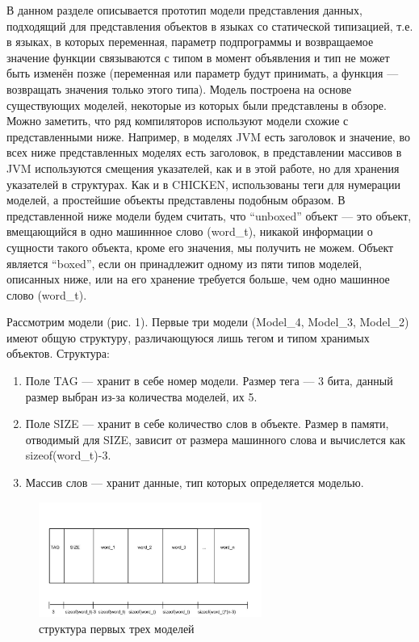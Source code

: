 В данном разделе описывается прототип модели представления данных,
подходящий для представления объектов в языках со статической типизацией, 
т.е. в языках, в которых переменная, параметр подпрограммы и
возвращаемое значение функции связываются с типом 
в момент объявления и тип не может быть изменён позже
(переменная или параметр будут принимать, а функция 
— возвращать значения только этого типа).
Модель построена на основе существующих моделей,
некоторые из которых были представлены в обзоре.
Можно заметить, что ряд компиляторов используют модели схожие с 
представленными ниже. 
Например, в моделях JVM
есть заголовок и значение, во всех ниже представленных моделях есть заголовок,
в представлении массивов в JVM используются смещения указателей,
как и в этой работе,
но для хранения указателей в структурах. 
Как и в CHIСKEN, использованы теги для нумерации моделей,
а простейшие объекты представлены подобным образом.
В представленной ниже модели будем считать, что ``unboxed''  объект — это объект,
вмещающийся в одно машиннное слово (word\_t), 
никакой информации о сущности такого объекта, кроме его значения, мы получить не можем.
Объект является ``boxed'', если он принадлежит одному из пяти
типов моделей, описанных ниже, или на его хранение требуется больше,
чем одно машинное слово (word\_t).

Рассмотрим модели (рис. 1). Первые три модели (Model\_4, Model\_3, Model\_2) имеют общую структуру, различающуюся лишь тегом и типом хранимых объектов.
Структура:
\begin{enumerate}
\item Поле TAG — хранит в себе номер модели. Размер тега — 3 бита, данный размер выбран из-за количества моделей, их 5.
\item Поле SIZE — хранит в себе количество слов в объекте. Размер в памяти, отводимый для SIZE, зависит от размера машинного слова и вычислется как sizeof(word\_t)-3.
\item Массив слов — хранит данные, тип которых определяется моделью.
\end{enumerate}

\begin{figure}[h]
\includegraphics[width=0.65\textwidth]{Kren/1}
\caption{структура первых трех моделей}
\end{figure}

